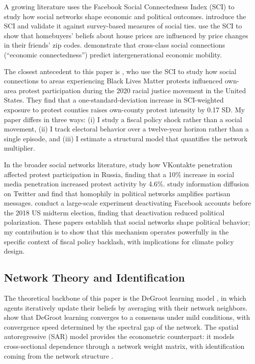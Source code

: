 \documentclass[12pt]{article}
\begin{document}
A growing literature uses the Facebook Social Connectedness Index (SCI) to study how social networks shape economic and political outcomes. \citet{bailey2018social} introduce the SCI and validate it against survey-based measures of social ties. \citet{bailey2018economic} use the SCI to show that homebuyers' beliefs about house prices are influenced by price changes in their friends' zip codes. \citet{chetty2022social1, chetty2022social2} demonstrate that cross-class social connections (``economic connectedness'') predict intergenerational economic mobility.

The closest antecedent to this paper is \citet{fluckiger2025bro}, who use the SCI to study how social connections to areas experiencing Black Lives Matter protests influenced own-area protest participation during the 2020 racial justice movement in the United States. They find that a one-standard-deviation increase in SCI-weighted exposure to protest counties raises own-county protest intensity by 0.17 SD. My paper differs in three ways: (i) I study a fiscal policy shock rather than a social movement, (ii) I track electoral behavior over a twelve-year horizon rather than a single episode, and (iii) I estimate a structural model that quantifies the network multiplier.

In the broader social networks literature, \citet{enikolopov2020social} study how VKontakte penetration affected protest participation in Russia, finding that a 10\% increase in social media penetration increased protest activity by 4.6\%. \citet{halberstam2016homophily} study information diffusion on Twitter and find that homophily in political networks amplifies partisan messages. \citet{allcott2020polarization} conduct a large-scale experiment deactivating Facebook accounts before the 2018 US midterm election, finding that deactivation reduced political polarization. These papers establish that social networks shape political behavior; my contribution is to show that this mechanism operates powerfully in the specific context of fiscal policy backlash, with implications for climate policy design.

\subsection{Network Theory and Identification}

The theoretical backbone of this paper is the DeGroot learning model \citep{degroot1974reaching}, in which agents iteratively update their beliefs by averaging with their network neighbors. \citet{golub2010naive} show that DeGroot learning converges to a consensus under mild conditions, with convergence speed determined by the spectral gap of the network. The spatial autoregressive (SAR) model \citep{anselin1988spatial, lee2004asymptotic, lesage2009introduction} provides the econometric counterpart: it models cross-sectional dependence through a network weight matrix, with identification coming from the network structure \citep{bramouelle2009identification}.
\end{document}
